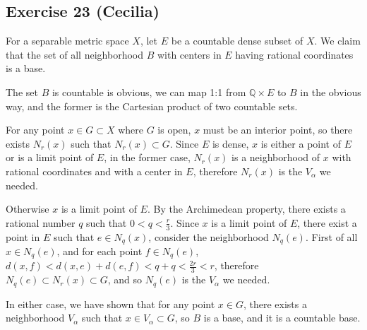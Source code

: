 \subsection*{Exercise 23 (Cecilia)}
For a separable metric space $ X $, let $ E $ be a countable dense subset of $ X $. We claim that the set of all neighborhood $ B $ with centers in $ E $ having rational coordinates is a base.

The set $ B $ is countable is obvious, we can map 1:1 from $ \mathbb{Q} \times E $ to $ B $ in the obvious way, and the former is the Cartesian product of two countable sets.

For any point $ x \in G \subset X $ where $ G $ is open, $ x $ must be an interior point, so there exists $ N_r(x) $ such that $ N_r(x) \subset G $. Since $ E $ is dense, $ x $ is either a point of $ E $ or is a limit point of $ E $, in the former case, $ N_r(x) $ is a neighborhood of $ x $ with rational coordinates and with a center in $ E $, therefore $ N_r(x) $ is the $ V_{\alpha} $ we needed.

Otherwise $ x $ is a limit point of $ E $. By the Archimedean property, there exists a rational number $ q $ such that $ 0 < q < \frac{r}{3} $. Since $ x $ is a limit point of $ E $, there exist a point in $ E $ such that $ e \in N_q(x) $, consider the neighborhood $ N_q(e) $. First of all $ x \in N_q(e) $, and for each point $ f \in N_q(e) $, $ d(x, f) < d(x, e) + d(e, f) < q + q < \frac{2r}{3} < r $, therefore $ N_q(e) \subset N_r(x) \subset G $, and so $ N_q(e) $ is the $ V_{\alpha} $ we needed.

In either case, we have shown that for any point $ x \in G $, there exists a neighborhood $ V_{\alpha} $ such that $ x \in V_{\alpha} \subset G $, so $ B $ is a base, and it is a countable base.